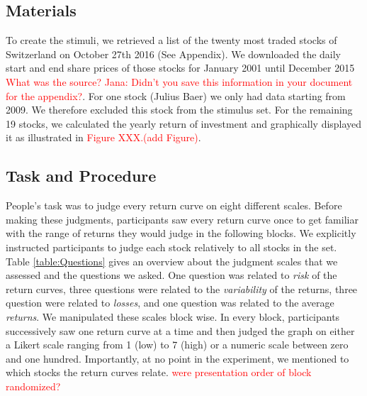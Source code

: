 \documentclass[a4paper,man, natbib,floatsintext]{apa6} %
\begin{document}
\subsection{Materials}
To create the stimuli, we retrieved a list of the twenty most traded stocks of Switzerland on October 27th 2016 (See Appendix). We downloaded the daily start and end share prices of those stocks for January 2001 until December 2015 \textcolor{red}{What was the source? Jana: Didn't you save this information in your document for the appendix?}. For one stock (Julius Baer) we only had data starting from 2009. We therefore excluded this stock from the stimulus set. For the remaining 19 stocks, we calculated the yearly return of investment and graphically displayed it as illustrated in \textcolor{red}{Figure XXX.(add Figure)}. 

\subsection{Task and Procedure}
People's task was to judge every return curve on eight different scales. Before making these judgments, participants saw every return curve once to get familiar with the range of returns they would judge in the following blocks. We explicitly instructed participants to judge each stock relatively to all stocks in the set. 
Table \ref{table:Questions} gives an overview about the judgment scales that we assessed and the questions we asked. One question was related to \textit{risk} of the return curves, three questions were related to the \textit{variability} of the returns, three question were related to \textit{losses}, and one question was related to the average \textit{returns}. We manipulated these scales block wise. In every block, participants successively saw one return curve at a time and then judged the graph on either a Likert scale ranging from 1 (low) to 7 (high) or a numeric scale between zero and one hundred. Importantly, at no point in the experiment, we mentioned to which stocks the return curves relate. \textcolor{red}{were presentation order of block randomized?}





\end{document}
